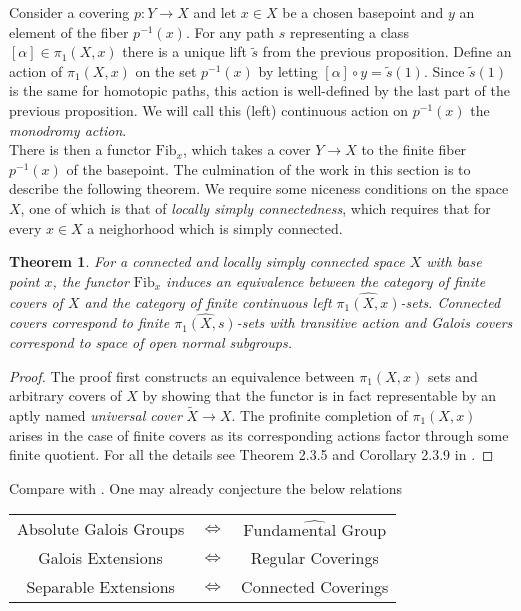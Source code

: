 \documentclass{article}
\newtheorem{theorem}{Theorem}[section]
\theoremstyle{definition}
\theoremstyle{remark}
\theoremstyle{plain}
\begin{document}
Consider a covering $p: Y \to X$ and let $x \in X$ be a chosen basepoint and $y$ an element of the fiber $p^{-1}(x)$.
	For any path $s$ representing a class $[\alpha] \in \pi_1(X,x)$ there is a unique lift $\widetilde{s}$ from the previous proposition.
	Define an action of $\pi_1(X,x)$ on the set $p^{-1}(x)$ by letting $[\alpha] \circ y = \widetilde{s}(1)$.
	Since $\widetilde{s}(1)$ is the same for homotopic paths, this action is well-defined by the last part of the previous proposition.
	We will call this (left) continuous action on $p^{-1}(x)$ the \textit{monodromy action}.\\
	\indent There is then a functor $\text{Fib}_x$, which takes a cover $Y \to X$ to the finite fiber $p^{-1}(x)$ of the basepoint.
The culmination of the work in this section is to describe the following theorem.
We require some niceness conditions on the space $X$, one of which is that of \textit{locally simply connectedness}, which requires that for every $x \in X$ a neighorhood which is simply connected.

	\begin{theorem}
	For a connected and locally simply connected space $X$ with base point $x$, the functor $\text{Fib}_x$ induces an equivalence between the category of finite covers of $X$ and the category of finite continuous left $\widehat{\pi_1(X,x)}$-sets.
	Connected covers correspond to finite $\widehat{\pi_1(X,s)}$-sets with transitive action and Galois covers correspond to space of open normal subgroups.
\end{theorem}
\begin{proof}
	The proof first constructs an equivalence between $\pi_1(X,x)$ sets and arbitrary covers of $X$ by showing that the functor is in fact representable by an aptly named \textit{universal cover} $\widetilde{X} \to X$.
The profinite completion of $\pi_1(X,x)$ arises in the case of finite covers as its corresponding actions factor through some finite quotient.
	For all the details see Theorem 2.3.5 and Corollary 2.3.9 in \cite{Szamuely}.
\end{proof}


Compare with .
One may already conjecture the below relations
\begin{center}
\begin{tabular}{ |c c c| } 
\hline
	Absolute Galois Groups & $\Longleftrightarrow$ & $\widehat{\text{Fundamental Group}}$ \\
 
	Galois Extensions & $\Longleftrightarrow$ & Regular Coverings\\
 
	Separable Extensions & $\Longleftrightarrow$ & Connected Coverings\\
 \hline
\end{tabular}
\end{center}
\end{document}
